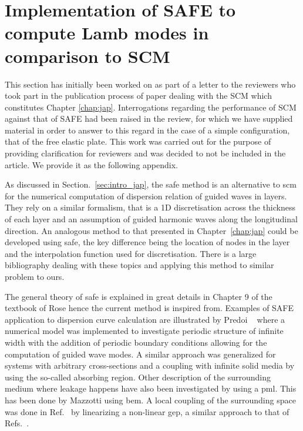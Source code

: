 \setcounter{equation}{0}
\renewcommand{\theequation}{\thesection.\arabic{equation}}

\section{Implementation of SAFE to compute Lamb modes in comparison to SCM}
\label{app:safe_lamb}

This section has initially been worked on as part of a letter to the reviewers who took part in the publication process of paper\cite{marechal2025} dealing with the SCM which constitutes Chapter \ref{chap:jap}. Interrogations regarding the performance of SCM against that of SAFE had been raised in the review, for which we have supplied material in order to answer to this regard in the case of a simple configuration, that of the free elastic plate. This work was carried out for the purpose of providing clarification for reviewers and was decided to not be included in the article. We provide it as the following appendix.

As discussed in Section.~\ref{sec:intro_jap}, the \acrshort{safe} method is an alternative to \acrshort{scm} for the numerical computation of dispersion relation of guided waves in layers. They rely on a similar formalism, that is a 1D discretisation across the thickness of each layer and an assumption of guided harmonic waves along the longitudinal direction. An analogous method to that presented in Chapter~\ref{chap:jap} could be developed using \acrshort{safe}, the key difference being the location of nodes in the layer and the interpolation function used for discretisation.
There is a large bibliography dealing with these topics and applying this method to similar problem to ours.  

The general theory of \acrshort{safe} is explained in great details in Chapter 9 of the textbook of Rose\cite{rose2014} hence the current method is inspired from. Examples of SAFE application to dispersion curve calculation are illustrated by Predoi \etal~\cite{predoi2007} where a numerical model was implemented to investigate periodic structure of infinite width with the addition of periodic boundary conditions allowing for the computation of guided wave modes. A similar approach was generalized for systems with arbitrary cross-sections and a coupling with infinite solid media by using the so-called absorbing region\cite{castaings2008}. Other description of the surrounding medium where leakage happens have also been investigated by using a \acrshort{pml}\cite{zuo2017}. This has been done by Mazzotti \etal using \acrshort{bem}\cite{mazzotti2013,mazzotti2014}. A local coupling of the surrounding space was done in Ref.~\cite{hayashi2014} by linearizing a non-linear \acrshort{gep}, a similar approach to that of Refs.~\cite{kiefer2019,marechal2025}.

